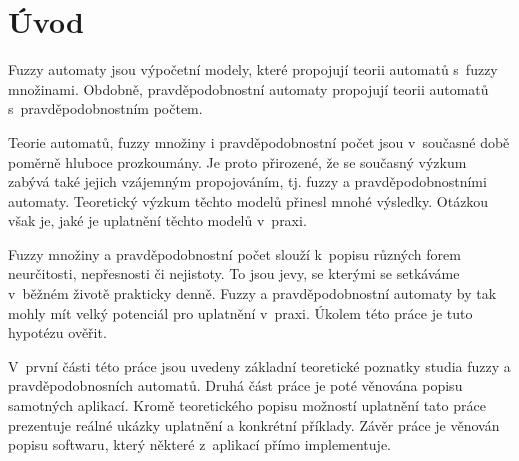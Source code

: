 % 
% 
% 
% 
% 
% 

\section{Úvod}
Fuzzy automaty jsou výpočetní modely, které propojují teorii automatů s~fuzzy množinami. Obdobně, pravděpodobnostní automaty propojují teorii automatů s~pravděpodobnostním počtem.

Teorie automatů, fuzzy množiny i pravděpodobnostní počet jsou v~současné době poměrně hluboce prozkoumány. Je proto přirozené, že se současný výzkum zabývá také jejich vzájemným propojováním, tj. fuzzy a pravděpodobnostními automaty. Teoretický výzkum těchto modelů přinesl mnohé výsledky. Otázkou však je, jaké je uplatnění těchto modelů v~praxi.

Fuzzy množiny a pravděpodobnostní počet slouží k~popisu různých forem neurčitosti, nepřesnosti či nejistoty. To jsou jevy, se kterými se setkáváme v~běžném životě prakticky denně. Fuzzy a pravděpodobnostní automaty by tak mohly mít velký potenciál pro uplatnění v~praxi. Úkolem této práce je tuto hypotézu ověřit.

V~první části této práce jsou uvedeny základní teoretické poznatky studia fuzzy a pravděpodobnosních automatů. Druhá část práce je poté věnována popisu samotných aplikací. Kromě teoretického popisu možností uplatnění tato práce prezentuje reálné ukázky uplatnění a konkrétní příklady. Závěr práce je věnován popisu softwaru, který některé z~aplikací přímo implementuje.


